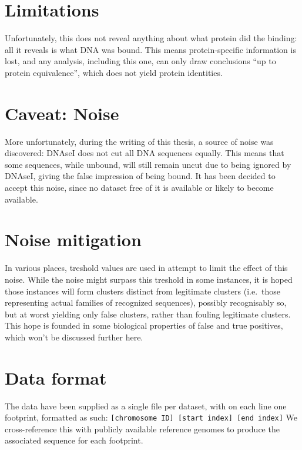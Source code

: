 \documentclass[fleqn]{book}
\begin{document}
\section{Limitations}\label{limitations}

Unfortunately, this does not reveal anything about what protein did the
binding: all it reveals is what DNA was bound. This means
protein-specific information is lost, and any analysis, including this
one, can only draw conclusions ``up to protein equivalence'', which does
not yield protein identities.

\section{Caveat: Noise}\label{caveat-noise}

More unfortunately, during the writing of this thesis, a source of noise
was discovered: DNAseI does not cut all DNA sequences equally. This
means that some sequences, while unbound, will still remain uncut due to
being ignored by DNAseI, giving the false impression of being bound. It
has been decided to accept this noise, since no dataset free of it is
available or likely to become available.

\section{Noise mitigation}\label{noise-mitigation}

In various places, treshold values are used in attempt to limit the
effect of this noise. While the noise might surpass this treshold in
some instances, it is hoped those instances will form clusters distinct
from legitimate clusters (i.e.~those representing actual families of
recognized sequences), possibly recognisably so, but at worst yielding
only false clusters, rather than fouling legitimate clusters. This hope
is founded in some biological properties of false and true positives,
which won't be discussed further here.

\section{Data format}\label{data-format}

The data have been supplied as a single file per dataset, with on each
line one footprint, formatted as such:
\texttt{{[}chromosome\ ID{]}\ {[}start\ index{]}\ {[}end\ index{]}} We
cross-reference this with publicly available reference genomes to
produce the associated sequence for each footprint.
\end{document}
